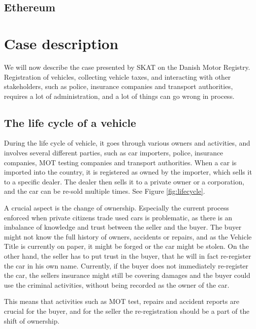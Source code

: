 \documentclass[oneside,a4paper,10pts,article]{memoir}
\begin{document}
\section{Ethereum}
\cite{buterin2013ethereum, wood2014ethereum}


\chapter{Case description}
\label{sec:case}
We will now describe the case presented by SKAT on the Danish Motor
Registry. Registration of vehicles, collecting vehicle taxes, and
interacting with other stakeholders, such as police, insurance
companies and transport authorities, requires a lot of administration,
and a lot of things can go wrong in process.

\section{The life cycle of a vehicle}
During the life cycle of vehicle, it goes through various owners and
activities, and involves several different parties, such as car
importers, police, insurance companies, MOT testing companies and
transport authorities. When a car is imported into the country, it is
registered as owned by the importer, which sells it to a specific
dealer. The dealer then sells it to a private owner or a corporation,
and the car can be re-sold multiple times. See Figure \ref{fig:lifecycle}.

A crucial aspect is the change of ownership. Especially the current
process enforced when private citizens trade used cars is problematic,
as there is an imbalance of knowledge and trust between the seller and
the buyer. The buyer might not know the full history of owners,
accidents or repairs, and as the Vehicle Title is currently on paper,
it might be forged or the car might be stolen. On the other hand, the
seller has to put trust in the buyer, that he will in fact re-register
the car in his own name. Currently, if the buyer does not immediately
re-register the car, the sellers insurance might still be covering
damages and the buyer could use the criminal activities, without being
recorded as the owner of the car.

This means that activities such as MOT test, repairs and accident
reports are crucial for the buyer, and for the seller the
re-registration should be a part of the shift of ownership.
\end{document}
